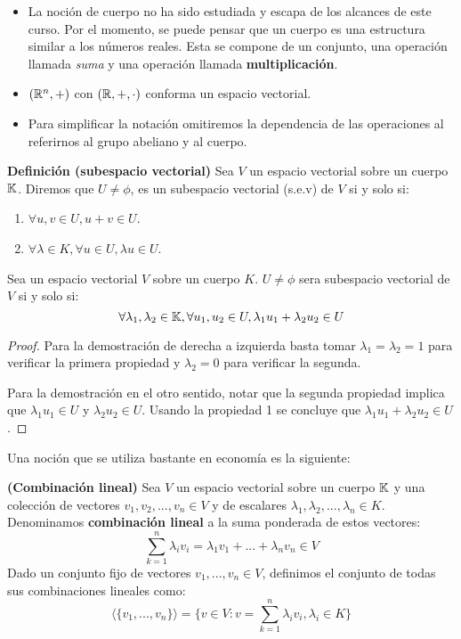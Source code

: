 \begin{nota}
	\begin{itemize}
		\item La noción de cuerpo no ha sido estudiada y escapa de los alcances de este curso. Por el momento, se puede pensar que un cuerpo es una estructura similar a los números reales. Esta se compone de un conjunto, una operación llamada \textit{suma} y una operación llamada \textbf{multiplicación}.   
		\item $(\mathbb{R}^n, +)$ con $(\mathbb{R}, + , \cdot)$ conforma un espacio vectorial.   
		\item Para simplificar la notación omitiremos la dependencia de las operaciones al referirnos al grupo abeliano y al cuerpo. 
	\end{itemize}
\end{nota}

\begin{definicion}
	\textbf{Definición (subespacio vectorial)}
	Sea $V$ un espacio vectorial sobre un cuerpo $\mathbb{K}$. Diremos que $U \neq \phi$, es un subespacio vectorial (s.e.v) de $V$ si y solo si: 
	\begin{enumerate}
		\item $\forall u, v \in U, u + v \in U $. 
		\item $\forall \lambda \in K, \forall u \in U, \lambda u \in U$. 
	\end{enumerate}
\end{definicion}

\begin{proposicion}
	Sea un espacio vectorial $V$ sobre un cuerpo $K$. $U \neq \phi$ sera subespacio vectorial de $V$ si y solo si: 
	$$ \forall \lambda _1 , \lambda_2 \in \mathbb{K} , \forall u_1, u_2 \in U, \lambda_1 u_1  + \lambda_2 u_2 \in U $$ 
\end{proposicion}

\begin{proof}
	Para la demostración de derecha a izquierda basta tomar $\lambda _1 = \lambda _2 = 1$ para verificar la primera propiedad y $\lambda_2 = 0$ para verificar la segunda.   
	
	Para la demostración en el otro sentido, notar que la segunda propiedad implica que $ \lambda_1 u_1 \in U $ y $\lambda_2 u_2 \in U$. Usando la propiedad 1 se concluye que $\lambda_1 u_1 + \lambda_2 u_2 \in U$. 
\end{proof}

Una noción que se utiliza bastante en economía es la siguiente: 

\begin{definicion}
	\textbf{(Combinación lineal)}
	Sea $V$ un espacio vectorial sobre un cuerpo $\mathbb{K}$ y una colección de vectores $v_1, v_2, ... ,v_n \in V$ y de escalares $\lambda_1 , \lambda_2, ... , \lambda_n \in K$. Denominamos \textbf{combinación lineal} a la suma ponderada de estos vectores: 
	$$ \sum_{k=1}^n \lambda_i v_i = \lambda_1 v_1  + ... + \lambda_n v_n \in V $$ 
	Dado un conjunto fijo de vectores $v_1, ... , v_n \in V$, definimos el conjunto de todas sus combinaciones lineales como: 
	$$ \langle \{ v_1, ... , v_n \} \rangle = \{ v \in V : v = \sum_{k=1}^n \lambda_i v_i , \lambda_i \in K \} $$ 
\end{definicion}


